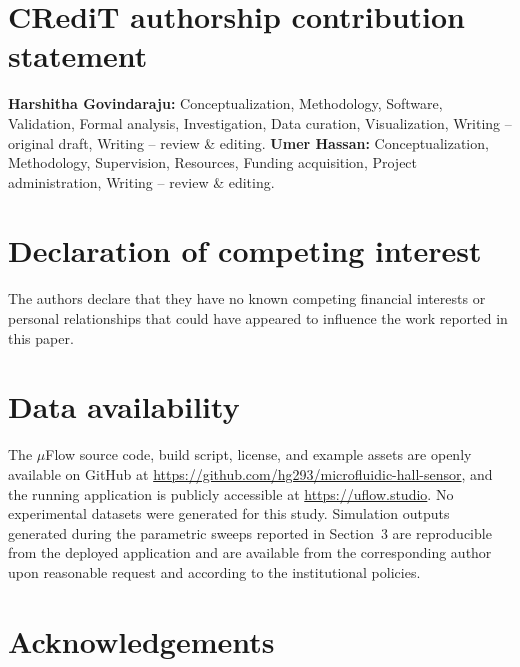 \documentclass[preprint,12pt,a4paper]{elsarticle}
\begin{document}
\section*{CRediT authorship contribution statement}

\textbf{Harshitha Govindaraju:} Conceptualization, Methodology, Software, Validation, Formal analysis, Investigation, Data curation, Visualization, Writing -- original draft, Writing -- review \& editing. \textbf{Umer Hassan:} Conceptualization, Methodology, Supervision, Resources, Funding acquisition, Project administration, Writing -- review \& editing.

\section*{Declaration of competing interest}

The authors declare that they have no known competing financial interests or personal relationships that could have appeared to influence the work reported in this paper.

\section*{Data availability}

The $\mu$Flow source code, build script, license, and example assets are openly available on GitHub at \url{https://github.com/hg293/microfluidic-hall-sensor}, and the running application is publicly accessible at \url{https://uflow.studio}. No experimental datasets were generated for this study. Simulation outputs generated during the parametric sweeps reported in Section~3 are reproducible from the deployed application and are available from the corresponding author upon reasonable request and according to the institutional policies.

\section*{Acknowledgements}
\end{document}
